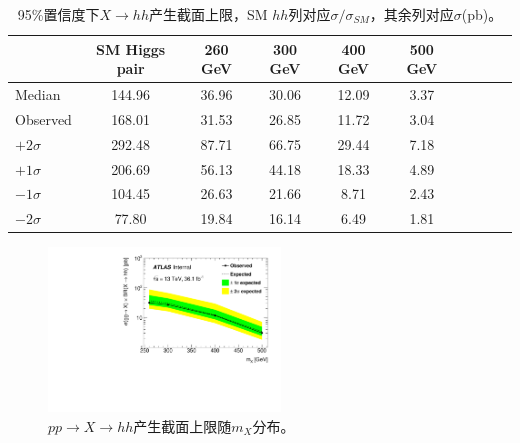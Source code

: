\begin{table}[!ht]
\scriptsize
\begin{center}
\begin{tabular}{l|c|cccccccc}
\hline
\hline
             & SM Higgs pair & 260 GeV  & 300 GeV & 400 GeV &500 GeV   \\
\hline
Median &144.96 &36.96 &30.06 &12.09 &3.37 \\
Observed    &168.01 &31.53 &26.85 &11.72 &3.04 \\
\hline
$+2\sigma$ &292.48 &87.71 &66.75 &29.44 &7.18 \\
$+1\sigma$ &206.69 &56.13 &44.18 &18.33 &4.89 \\
$-1\sigma$ &104.45 &26.63 &21.66 &8.71 &2.43 \\
$-2\sigma$ &77.80 &19.84 &16.14 &6.49 &1.81 \\
\hline
\hline
\end{tabular}
\caption{95\%置信度下$X\rightarrow hh$产生截面上限，SM $hh$列对应$\sigma/\sigma_{SM}$，其余列对应$\sigma$(pb)。}
\label{tab:upper_limits_2lss}
\end{center}
\end{table}

\begin{figure}[!h!tpb]
  \centering
  \includegraphics[width=0.55\textwidth, angle=-90]{fig/Statistical/limitAllSys.pdf}
  \caption{$pp\rightarrow X \rightarrow hh$产生截面上限随$m_X$分布。}
\label{fig:limit_plots_2lss}
\end{figure}

